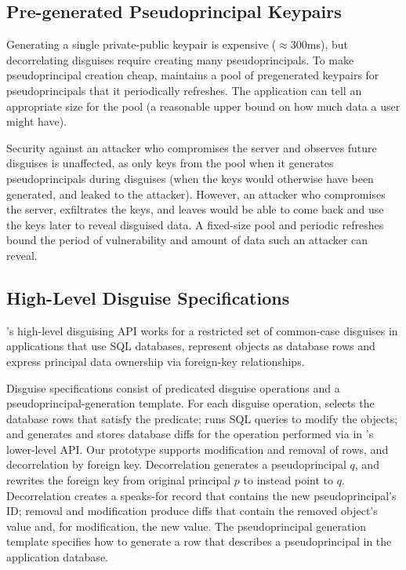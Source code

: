 \subsection{Pre-generated Pseudoprincipal Keypairs}
%
Generating a single private-public keypair is expensive ($\approx$300ms), but
decorrelating disguises require creating many pseudoprincipals.
%
To make pseudoprincipal creation cheap, \sys maintains a pool of
pregenerated keypairs for pseudoprincipals that it periodically refreshes.
%
The application can tell \sys an appropriate size for the pool (\eg a reasonable
upper bound on how much data a user might have).
%

%
Security against an attacker who compromises the server and observes future
disguises is unaffected, as \sys only keys from the pool when it generates
pseudoprincipals during disguises (when the keys would otherwise have been
generated, and leaked to the attacker).
%
However, an attacker who compromises the server, exfiltrates the keys, and
leaves would be able to come back and use the keys later to reveal disguised
data.
%
A fixed-size pool and periodic refreshes bound the period of vulnerability and
amount of data such an attacker can reveal.
%

\subsection{High-Level Disguise Specifications}
%
\sys's high-level disguising API works for a restricted set of common-case
disguises in applications that use SQL databases, represent objects as
database rows and express principal data ownership via foreign-key
relationships.
%

%
Disguise specifications consist of predicated disguise operations
and a pseudoprincipal-generation template.
%
For each disguise operation, \sys selects the database rows that satisfy
the predicate; runs SQL queries to modify the objects; and generates and
stores database diffs for the operation performed via  in
\sys's lower-level API.
%
Our prototype supports modification and removal of rows, and decorrelation
by foreign key.
%
Decorrelation generates a pseudoprincipal $q$, and rewrites the foreign
key from original principal $p$ to instead point to $q$.
%
Decorrelation creates a speaks-for record that contains the new
pseudoprincipal's ID; removal and modification produce diffs that contain
the removed object's value and, for modification, the new value.
%
The pseudoprincipal generation template specifies how to generate a row
that describes a pseudoprincipal in the application database.
%

